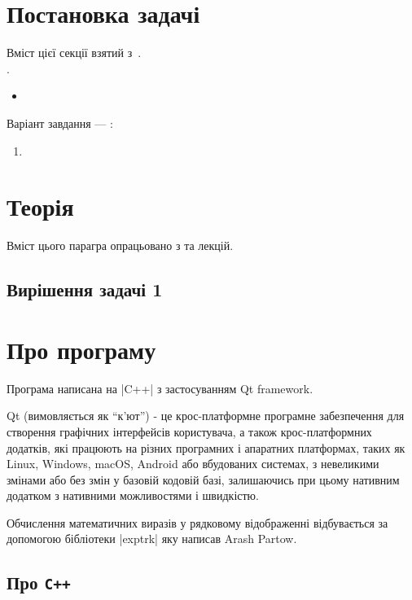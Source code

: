 \documentclass[\mainDocument]{subfiles}
\begin{document}
	\chapter{Постановка задачі}
	Вміст цієї секції взятий з~\cite{computational_methods}.\\
	 \worktheme.\\
	\begin{itemize}
		\item
	\end{itemize}
	Варіант завдання --- \studentnumber:
	\begin{enumerate}
		\item
	\end{enumerate}

	\chapter{Теорія}
	Вміст цього парагра опрацьовано з \cite{computational_methods} та лекцій.
	\section{Вирішення задачі 1}

	\FloatBarrier
	\chapter{Про програму}
	Програма написана на \textinline|C++| з застосуванням Qt framework.

	Qt (вимовляється як \enquote{к'ют}) - це крос-платформне
	програмне забезпечення для створення графічних інтерфейсів користувача, а також
	крос-платформних додатків, які працюють на різних програмних і апаратних
	платформах, таких як Linux, Windows, macOS, Android або вбудованих системах, з
	невеликими змінами або без змін у базовій кодовій базі, залишаючись при цьому
	нативним додатком з нативними можливостями і швидкістю.
	
	Обчислення математичних виразів у рядковому відображенні відбувається за допомогою бібліотеки \textinline|exptrk| яку написав Arash Partow\cite{exprtk,exprtk-github}.

	\section{Про \texttt{C++}}
\end{document}
